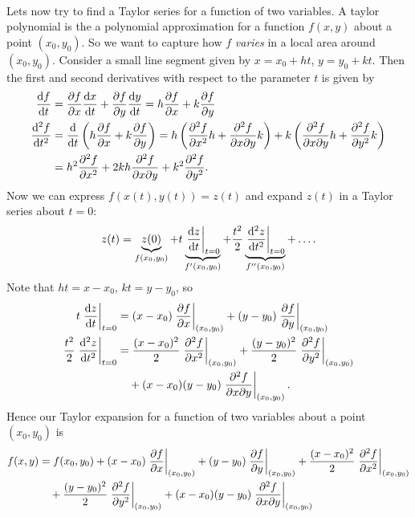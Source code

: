 \documentclass[../multivariate_calculus.tex]{subfiles}
\begin{document}
        \paragraph{}
        Lets now try to find a Taylor series for a function of two variables.
        A taylor polynomial is the a polynomial approximation for a function $f(x,y)$ about a point $(x_0,y_0)$.
        So we want to capture how $f$ \textit{varies} in a local area around $(x_0,y_0)$.
        Consider a small line segment given by $x=x_0+ht$, $y=y_0+kt$.
        Then the first and second derivatives with respect to the parameter $t$ is given by
        \begin{align}
            \dv{f}{t}&=\pdv{f}{x}\dv{x}{t}+\pdv{f}{y}\dv{y}{t}=h\pdv{f}{x}+k\pdv{f}{y}\\
            \dv[2]{f}{t}&=\frac{\mathrm{d}}{\mathrm{d}t}\left(h\pdv{f}{x}+k\pdv{f}{y}\right)=h\left(\pdv[2]{f}{x}h+\frac{\partial^2 f}{\partial x\partial y}k\right)+k\left(\frac{\partial^2 f}{\partial x\partial y}h+\pdv[2]{f}{y}k\right)\\
            &=h^2\pdv[2]{f}{x}+2kh\frac{\partial^2 f}{\partial x\partial y}+k^2\pdv[2]{f}{y}.
        \end{align}
        Now we can express $f(x(t),y(t))=z(t)$ and expand $z(t)$ in a Taylor series about $t=0$:
        \begin{equation}
            z(t)=\underbrace{z(0)}_{f(x_0,y_0)}+t\underbrace{\left.\dv{z}{t}\right|_{t=0}}_{f^\prime(x_0,y_0)}+\frac{t^2}{2}\underbrace{\left.\dv[2]{z}{t}\right|_{t=0}}_{f^{\prime\prime}(x_0,y_0)}+\dots.
        \end{equation}
        Note that $ht=x-x_0$, $kt=y-y_0$, so
        \begin{align}
            t\left.\dv{z}{t}\right|_{t=0}&=(x-x_0)\left.\pdv{f}{x}\right|_{(x_0,y_0)}+(y-y_0)\left.\pdv{f}{y}\right|_{(x_0,y_0)}\\
            \frac{t^2}{2}\left.\dv[2]{z}{t}\right|_{t=0}&=\frac{(x-x_0)^2}{2}\left.\pdv[2]{f}{x}\right|_{(x_0,y_0)}+\frac{(y-y_0)^2}{2}\left.\pdv[2]{f}{y}\right|_{(x_0,y_0)}\\
            &\quad+(x-x_0)(y-y_0)\left.\frac{\partial^2 f}{\partial x\partial y}\right|_{(x_0,y_0)}.
        \end{align}
        Hence our Taylor expansion for a function of two variables about a point $(x_0,y_0)$ is
        \begin{align}\label{eq-taylor-series-2D}
            f(x,y)&=f(x_0,y_0)+(x-x_0)\left.\pdv{f}{x}\right|_{(x_0,y_0)}+(y-y_0)\left.\pdv{f}{y}\right|_{(x_0,y_0)}+\frac{(x-x_0)^2}{2}\left.\pdv[2]{f}{x}\right|_{(x_0,y_0)}\\
            &\quad+\frac{(y-y_0)^2}{2}\left.\pdv[2]{f}{y}\right|_{(x_0,y_0)}+(x-x_0)(y-y_0)\left.\frac{\partial^2 f}{\partial x\partial y}\right|_{(x_0,y_0)}
        \end{align}
\end{document}
